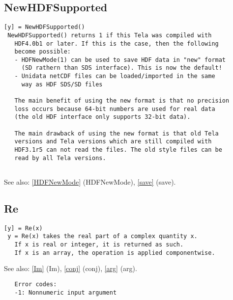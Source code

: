 \documentclass[a4paper]{article}
\begin{document}
\subsection{NewHDFSupported\label{NewHDFSupported}}

\begin{tscreen}
\begin{verbatim}
[y] = NewHDFSupported()
 NewHDFSupported() returns 1 if this Tela was compiled with
   HDF4.0b1 or later. If this is the case, then the following
   become possible:
   - HDFNewMode(1) can be used to save HDF data in "new" format
     (SD rathern than SDS interface). This is now the default!
   - Unidata netCDF files can be loaded/imported in the same
     way as HDF SDS/SD files
   
   The main benefit of using the new format is that no precision
   loss occurs because 64-bit numbers are used for real data
   (the old HDF interface only supports 32-bit data).
   
   The main drawback of using the new format is that old Tela
   versions and Tela versions which are still compiled with
   HDF3.1r5 can not read the files. The old style files can be
   read by all Tela versions.
   
\end{verbatim}

See also: \ref{HDFNewMode} {(HDFNewMode)}, \ref{save} {(save)}.
\end{tscreen}





\subsection{Re\label{Re}}

\begin{tscreen}
\begin{verbatim}
[y] = Re(x)
 y = Re(x) takes the real part of a complex quantity x.
   If x is real or integer, it is returned as such.
   If x is an array, the operation is applied componentwise.
\end{verbatim}

See also: \ref{Im} {(Im)}, \ref{conj} {(conj)}, \ref{arg} {(arg)}.
\begin{verbatim}
   Error codes:
   -1: Nonnumeric input argument 
\end{verbatim}
\end{tscreen}
\end{document}
